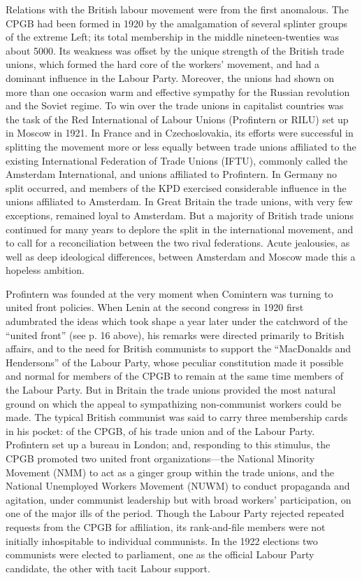 Relations with the British labour movement were from the first anomalous. The CPGB had been formed in 1920 by the amalgamation of several splinter groups of the extreme Left; its total membership in the middle nineteen-twenties was about 5000. Its weakness was offset by the unique strength of the British trade unions, which formed the hard core of the workers' movement, and had a dominant influence in the Labour Party. Moreover, the unions had shown on more than one occasion warm and effective sympathy for the Russian revolution and the Soviet regime. To win over the trade unions in capitalist countries was the task of the Red International of Labour Unions (Profintern or RILU) set up in Moscow in 1921. In France and in Czechoslovakia, its efforts were successful in splitting the movement more or less equally between trade unions affiliated to the existing International Federation of Trade Unions (IFTU), commonly called the Amsterdam International, and unions affiliated to Profintern. In Germany no split occurred, and members of the KPD exercised considerable influence in the unions affiliated to Amsterdam. In Great Britain the trade unions, with very few exceptions, remained loyal to Amsterdam. But a majority of British trade unions continued for many years to deplore the split in the international movement, and to call for a reconciliation between the two rival federations. Acute jealousies, as well as deep ideological differences, between Amsterdam and Moscow made this a hopeless ambition. 

Profintern was founded at the very moment when Comintern was turning to united front policies. When Lenin at the second congress in 1920 first adumbrated the ideas which took shape a year later under the catchword of the ``united front'' (see p. 16 above), his remarks were directed primarily to British affairs, and to the need for British communists to support the ``MacDonalds and Hendersons'' of the Labour Party, whose peculiar constitution made it possible and normal for members of the CPGB to remain at the same time members of the Labour Party. But in Britain the trade unions provided the most natural ground on which the appeal to sympathizing non-communist workers could be made. The typical British communist was said to carry three membership cards in his pocket: of the CPGB, of his trade union and of the Labour Party. Profintern set up a bureau in London; and, responding to this stimulus, the CPGB promoted two united front organizations---the National Minority Movement (NMM) to act as a ginger group within the trade unions, and the National Unemployed Workers Movement (NUWM) to conduct propaganda and agitation, under communist leadership but with broad workers' participation, on one of the major ills of the period. Though the Labour Party rejected repeated requests from the CPGB for affiliation, its rank-and-file members were not initially inhospitable to individual communists. In the 1922 elections two communists were elected to parliament, one as the official Labour Party candidate, the other with tacit Labour support. 

